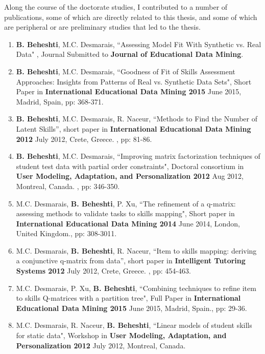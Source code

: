 Along the course of the doctorate studies, I contributed to a number of publications, some of which are directly related to this thesis, and some of which are peripheral or are preliminary studies that led to the thesis.

\begin{enumerate}

\item \textbf{B. Beheshti}, M.C. Desmarais, “Assessing Model Fit With Synthetic vs. Real Data" , Journal Submitted to \textbf{Journal of Educational Data Mining}.

\item \textbf{B. Beheshti}, M.C. Desmarais, “Goodness of Fit of Skills Assessment Approaches: Insights from Patterns of Real vs. Synthetic Data Sets", Short Paper  in \textbf{International Educational Data Mining 2015} June 2015, Madrid, Spain, pp: 368-371.

\item \textbf{B. Beheshti}, M.C. Desmarais, R. Naceur, “Methods to Find the Number of Latent Skills”, short paper in \textbf{International Educational Data Mining 2012} July 2012, Crete, Greece. , pp: 81-86.

\item \textbf{B. Beheshti}, M.C. Desmarais, “Improving matrix factorization techniques of student test data with partial order constraints", Doctoral consortium in \textbf{User Modeling, Adaptation, and Personalization 2012} Aug 2012, Montreal, Canada. , pp: 346-350.

\item M.C. Desmarais, \textbf{B. Beheshti}, P. Xu, “The refinement of a q-matrix: assessing methods to validate tasks to skills mapping", Short paper in \textbf{International Educational Data Mining 2014} June 2014, London, United Kingdom., pp: 308-3011.

\item M.C. Desmarais, \textbf{B. Beheshti}, R. Naceur, “Item to skills mapping: deriving a conjunctive q-matrix from data”, short paper in \textbf{Intelligent Tutoring Systems 2012} July 2012, Crete, Greece. , pp: 454-463.

\item M.C. Desmarais, P. Xu, \textbf{B. Beheshti}, “Combining techniques to refine item to skills Q-matrices with a partition tree", Full Paper  in \textbf{International Educational Data Mining 2015} June 2015, Madrid, Spain., pp: 29-36.

\item M.C. Desmarais, R. Naceur, \textbf{B. Beheshti}, “Linear models of student skills for static data", Workshop in \textbf{User Modeling, Adaptation, and Personalization 2012} July 2012, Montreal, Canada.
\end{enumerate}



